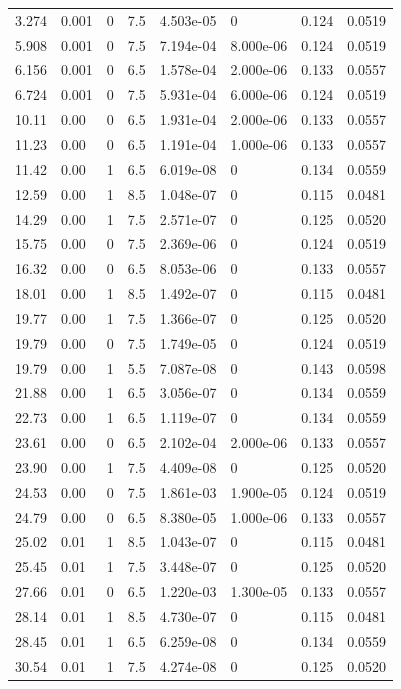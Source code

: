 \documentclass[preview]{standalone}
\begin{document}
{{\begin{tabular}{L{1.2cm}C{1.2cm} C{0.3cm}C{0.5cm} C{1.4cm}C{1.4cm} C{1.4cm}C{1.4cm}}
  3.274  &  0.001  & 0     & 7.5 &  4.503e-05  & 0  & 0.124 &  0.0519   \\ 
  5.908  &  0.001  & 0     & 7.5 &  7.194e-04  & 8.000e-06  & 0.124 &  0.0519   \\ 
  6.156  &  0.001  & 0     & 6.5 &  1.578e-04  & 2.000e-06  & 0.133 &  0.0557   \\ 
  6.724  &  0.001  & 0     & 7.5 &  5.931e-04  & 6.000e-06  & 0.124 &  0.0519   \\ 
  10.11  &  0.00  & 0     & 6.5 &  1.931e-04  & 2.000e-06  & 0.133 &  0.0557   \\ 
  11.23  &  0.00  & 0     & 6.5 &  1.191e-04  & 1.000e-06  & 0.133 &  0.0557   \\ 
  11.42  &  0.00  & 1     & 6.5 &  6.019e-08  & 0  & 0.134 &  0.0559   \\ 
  12.59  &  0.00  & 1     & 8.5 &  1.048e-07  & 0  & 0.115 &  0.0481   \\ 
  14.29  &  0.00  & 1     & 7.5 &  2.571e-07  & 0  & 0.125 &  0.0520   \\ 
  15.75  &  0.00  & 0     & 7.5 &  2.369e-06  & 0  & 0.124 &  0.0519   \\ 
  16.32  &  0.00  & 0     & 6.5 &  8.053e-06  & 0  & 0.133 &  0.0557   \\ 
  18.01  &  0.00  & 1     & 8.5 &  1.492e-07  & 0  & 0.115 &  0.0481   \\ 
  19.77  &  0.00  & 1     & 7.5 &  1.366e-07  & 0  & 0.125 &  0.0520   \\ 
  19.79  &  0.00  & 0     & 7.5 &  1.749e-05  & 0  & 0.124 &  0.0519   \\ 
  19.79  &  0.00  & 1     & 5.5 &  7.087e-08  & 0  & 0.143 &  0.0598   \\ 
  21.88  &  0.00  & 1     & 6.5 &  3.056e-07  & 0  & 0.134 &  0.0559   \\ 
  22.73  &  0.00  & 1     & 6.5 &  1.119e-07  & 0  & 0.134 &  0.0559   \\ 
  23.61  &  0.00  & 0     & 6.5 &  2.102e-04  & 2.000e-06  & 0.133 &  0.0557   \\ 
  23.90  &  0.00  & 1     & 7.5 &  4.409e-08  & 0  & 0.125 &  0.0520   \\ 
  24.53  &  0.00  & 0     & 7.5 &  1.861e-03  & 1.900e-05  & 0.124 &  0.0519   \\ 
  24.79  &  0.00  & 0     & 6.5 &  8.380e-05  & 1.000e-06  & 0.133 &  0.0557   \\ 
  25.02  &  0.01  & 1     & 8.5 &  1.043e-07  & 0  & 0.115 &  0.0481   \\ 
  25.45  &  0.01  & 1     & 7.5 &  3.448e-07  & 0  & 0.125 &  0.0520   \\ 
  27.66  &  0.01  & 0     & 6.5 &  1.220e-03  & 1.300e-05  & 0.133 &  0.0557   \\ 
  28.14  &  0.01  & 1     & 8.5 &  4.730e-07  & 0  & 0.115 &  0.0481   \\ 
  28.45  &  0.01  & 1     & 6.5 &  6.259e-08  & 0  & 0.134 &  0.0559   \\ 
  30.54  &  0.01  & 1     & 7.5 &  4.274e-08  & 0  & 0.125 &  0.0520   \\ 
\hline 
\end{tabular} 

}}
\end{document}

